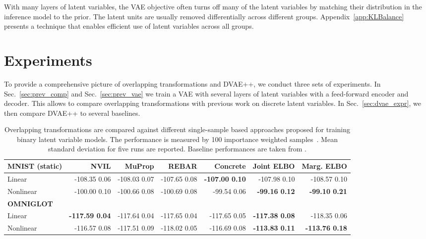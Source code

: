 \documentclass{article}
\begin{document}
With many layers of latent variables, the VAE objective often turns off many of the latent variables by matching 
their distribution in the inference model to the prior. The latent units are usually removed differentially across different groups. 
Appendix~\ref{app:KLBalance} presents a technique that enables efficient use of latent variables across all groups.

\section{Experiments}
To provide a comprehensive picture of overlapping transformations and DVAE++, we conduct three sets of experiments. In Sec.~\ref{sec:prev_comp} and Sec.~\ref{sec:prev_vae}
we train a VAE with several layers of latent variables with a feed-forward encoder and decoder. This allows to compare
overlapping transformations with previous work on discrete latent variables. In Sec.~\ref{sec:dvae_expr}, we then compare DVAE++ to several baselines.

\begin{table*}
\caption{Overlapping transformations are compared against different single-sample based approaches proposed for training binary latent variable models. 
The performance is measured by 100 importance weighted samples~\cite{burda2015importance}. Mean  standard deviation for five runs are reported. Baseline performances are taken from \cite{tucker2017rebar}.} \label{tab:res_sbn}
\small
\centering
\begin{tabular}{ l r r r r r r}
\textbf{MNIST (static)}   & NVIL    & MuProp & REBAR &  Concrete & Joint ELBO & Marg. ELBO \\
\hline
Linear       & -108.35  0.06 & -108.03  0.07 & -107.65  0.08 & \textbf{-107.00  0.10} & -107.98  0.10 & -108.57  0.10 \\
Nonlinear    & -100.00  0.10 & -100.66  0.08 & -100.69  0.08 & -99.54  0.06 & \textbf{-99.16  0.12} & \textbf{-99.10  0.21}  \\
\textbf{OMNIGLOT} & &  &  &  &  & \\
\hline
Linear       & \textbf{-117.59  0.04} & -117.64  0.04 & -117.65  0.04 & -117.65  0.05 & \textbf{-117.38  0.08}   & -118.35  0.06 \\
Nonlinear    & -116.57  0.08 & -117.51  0.09 & -118.02  0.05 & -116.69  0.08 & \textbf{-113.83  0.11}  & \textbf{-113.76 	0.18} \\
\hline
\end{tabular} 
\end{table*}
\end{document}
